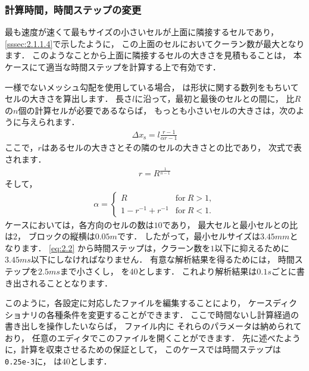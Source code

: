 \subsubsection{計算時間，時間ステップの変更}
\label{sssec:2.1.6.2}
最も速度が速くて最もサイズの小さいセルが上面に隣接するセルであり，
\autoref{sssec:2.1.1.4}で示したように，
この上面のセルにおいてクーラン数が最大となります．
このようなことから上面に隣接するセルの大きさを見積もることは，
本ケースにて適当な時間ステップを計算する上で有効です．

一様でないメッシュ勾配を使用している場合，
%
%
は形状に関する数列をもちいてセルの大きさを算出します．
長さ$l$に沿って，最初と最後のセルとの間に，
比$R$の$n$個の計算セルが必要であるならば，
もっとも小さいセルの大きさは，次のように与えられます．
\begin{align}
 \label{eq:2.5}
  \Delta x_{\mathrm{s}} = l\frac{r - 1}{\alpha r - 1}
\end{align}
ここで，$r$はあるセルの大きさとその隣のセルの大きさとの比であり，
次式で表されます．
\begin{align}
 \label{eq:2.6}
  r = R^{\frac{1}{n-1}}
\end{align}
そして，
\begin{align}
 \label{eq:2.7}
  \alpha =
  \begin{cases}
   R & \text{for}\ R > 1, \\
   1 - r^{-1} + r^{-1} & \text{for}\ R < 1.
  \end{cases}
\end{align}
ケースにおいては，各方向のセルの数は$10$であり，
最大セルと最小セルとの比は$2$，
ブロックの縦横は$0.05\unit{m}$です．
したがって，最小セルサイズは$3.45\unit{mm}$となります．
\autoref{eq:2.2} から時間ステップは，クラーン数を$1$以下に抑えるために
$3.45\unit{ms}$以下にしなければなりません．
有意な解析結果を得るためには，
時間ステップを$2.5\unit{ms}$まで小さくし，
を40とします．
これより解析結果は$0.1\unit{s}$ごとに書き出されることとなります．

このように，各設定に対応したファイルを編集することにより，
ケースディクショナリの各種条件を変更することができます．
ここで時間ないし計算経過の書き出しを操作したいならば，
ファイル内に
それらのパラメータは納められており，
任意のエディタでこのファイルを開くことができます．
先に述べたように，計算を収束させるための保証として，
このケースでは時間ステップは\texttt{0.25e-3}に，
は40とします．

